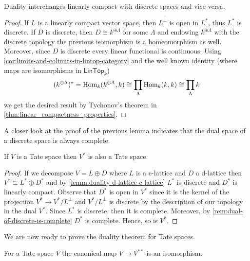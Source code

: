 \begin{lemma}\label{lemm:duality-d-lattice-c-lattice}
	Duality interchanges linearly compact with discrete spaces and vice-versa. 
\end{lemma}
\begin{proof}
	If $L$ is a linearly compact vector space, then $L^{\perp}$ is open in $L^{*}$, thus $L^{*}$ is discrete. If $D$ is discrete, then $D \cong k^{\oplus \Lambda}$ for some $\Lambda$ and endowing $k^{\oplus \Lambda}$ with the discrete topology the previous isomorphism is a homeomorphism as well. Moreover, since $D$ is discrete every linear functional is continuous. Using \cref{cor:limits-and-colimits-in-lintop-category} and the well known identity (where maps are isomorphisms in $\mathsf{LinTop}_{k}$)
	\[
		(k^{\oplus \Lambda})^{*} = \operatorname{Hom}_{k}(k^{\oplus \Lambda}, k) \cong \prod_{\Lambda} \operatorname{Hom}_{k}(k, k) \cong \prod_{\Lambda} k
	\]
	we get the desired result by Tychonov's theorem in \cref{thm:linear_compactness_properties}. 
\end{proof}
\begin{remark}\label{rem:dual-of-discrete-is-complete}
	A closer look at the proof of the previous lemma indicates that the dual space of a discrete space is always complete.
\end{remark}
\begin{proposition}\label{prop:dual-space-is-tate}
	If $V$ is a Tate space then $V^{*}$ is also a Tate space.
\end{proposition}
\begin{proof}
	If we decompose $V = L \oplus D$ where $L$ is a c-lattice and $D$ a d-lattice then $V^{*} \cong L^{*} \oplus D^{*}$ and by \cref{lemm:duality-d-lattice-c-lattice} $L^{*}$ is discrete and $D^{*}$ is linearly compact. Observe that $D^{*}$ is open in $V^{*}$ since it is the kernel of the projection $V^{*} \to V^{*}/L^{\perp}$ and $V^{*}/L^{\perp}$ is discrete by the description of our topology in the dual $V^{*}$. Since $L^{*}$ is discrete, then it is complete. Moreover, by \cref{rem:dual-of-discrete-is-complete} $D^{*}$ is complete. Hence, so is $V^{*}$.
\end{proof}
We are now ready to prove the duality theorem for Tate spaces.
\begin{theorem}\label{thm:self-duality}
	For a Tate space $V$ the canonical map $V \to V^{**}$ is an isomorphism.
\end{theorem}
